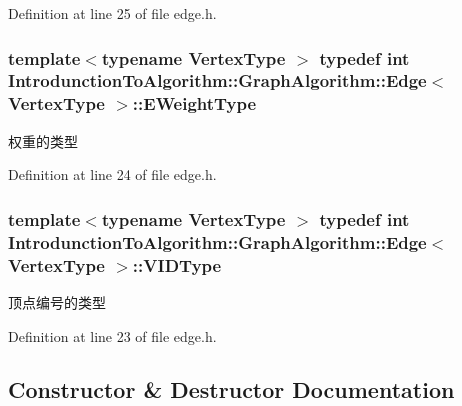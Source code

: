 Definition at line 25 of file edge.\+h.

\hypertarget{struct_introdunction_to_algorithm_1_1_graph_algorithm_1_1_edge_a34045c46a299bb27dab97ba7e3c554c3}{}
\subsubsection[{E\+Weight\+Type}]{\setlength{\rightskip}{0pt plus 5cm}template$<$typename Vertex\+Type $>$ typedef int {\bf Introdunction\+To\+Algorithm\+::\+Graph\+Algorithm\+::\+Edge}$<$ Vertex\+Type $>$\+::{\bf E\+Weight\+Type}}\label{struct_introdunction_to_algorithm_1_1_graph_algorithm_1_1_edge_a34045c46a299bb27dab97ba7e3c554c3}
权重的类型 

Definition at line 24 of file edge.\+h.

\hypertarget{struct_introdunction_to_algorithm_1_1_graph_algorithm_1_1_edge_afe54a3bbe1f907ed578054641bf8ea07}{}
\subsubsection[{V\+I\+D\+Type}]{\setlength{\rightskip}{0pt plus 5cm}template$<$typename Vertex\+Type $>$ typedef int {\bf Introdunction\+To\+Algorithm\+::\+Graph\+Algorithm\+::\+Edge}$<$ Vertex\+Type $>$\+::{\bf V\+I\+D\+Type}}\label{struct_introdunction_to_algorithm_1_1_graph_algorithm_1_1_edge_afe54a3bbe1f907ed578054641bf8ea07}
顶点编号的类型 

Definition at line 23 of file edge.\+h.



\subsection{Constructor \& Destructor Documentation}
\hypertarget{struct_introdunction_to_algorithm_1_1_graph_algorithm_1_1_edge_a0b1204366a8df8fa4de12bb233bd8e94}{}
